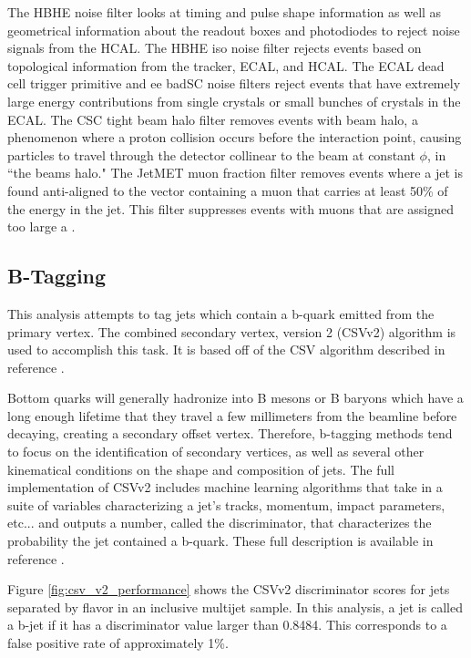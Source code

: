    The HBHE noise filter looks at timing and pulse shape information as well as geometrical information about the readout boxes and photodiodes to reject noise signals from the HCAL. The HBHE iso noise filter rejects events based on topological information from the tracker, ECAL, and HCAL. The ECAL dead cell trigger primitive and ee badSC noise filters reject events that have extremely large energy contributions from single crystals or small bunches of crystals in the ECAL. The CSC tight beam halo filter removes events with beam halo, a phenomenon where a proton collision occurs before the interaction point, causing particles to travel through the detector collinear to the beam at constant $\phi$, in ``the beams halo." The JetMET muon fraction filter removes events where a jet is found anti-aligned to the \MET vector containing a muon that carries at least 50\% of the energy in the jet. This filter suppresses events with muons that are assigned too large a \pt.

  \subsection{B-Tagging} \label{sec:b-tagging}
    This analysis attempts to tag jets which contain a b-quark emitted from the primary vertex. The combined secondary vertex, version 2 (CSVv2) algorithm  is used to accomplish this task. It is based off of the CSV algorithm described in reference \cite{btag_csv}. 

    Bottom quarks will generally hadronize into B mesons or B baryons which have a long enough lifetime that they travel a few millimeters from the beamline before decaying, creating a secondary offset vertex. Therefore, b-tagging methods tend to focus on the identification of secondary vertices, as well as several other kinematical conditions on the shape and composition of jets\cite{btag_strassler}. The full implementation of CSVv2 includes machine learning algorithms that take in a suite of variables characterizing a jet's tracks, momentum, impact parameters, etc... and outputs a number, called the discriminator, that characterizes the probability the jet contained a b-quark. These full description is available in reference \cite[section 5.1.2]{cms_heavy_tagging}. 

    Figure \ref{fig:csv_v2_performance} shows the CSVv2 discriminator scores for jets separated by flavor in an inclusive multijet sample. In this analysis, a jet is called a b-jet if it has a discriminator value larger than 0.8484. This corresponds to a false positive rate of approximately 1\%. 

